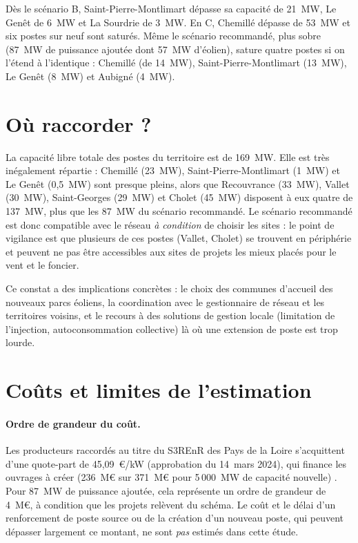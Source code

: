 \documentclass[11pt, a4paper]{report}
\begin{document}

Dès le scénario B, Saint-Pierre-Montlimart dépasse sa capacité de 21~MW, Le Genêt de 6~MW et La Sourdrie de 3~MW. En C, Chemillé dépasse de 53~MW et six postes sur neuf sont saturés. Même le scénario recommandé, plus sobre (87~MW de puissance ajoutée dont 57~MW d'éolien), sature quatre postes si on l'étend à l'identique : Chemillé (de 14~MW), Saint-Pierre-Montlimart (13~MW), Le Genêt (8~MW) et Aubigné (4~MW).

\section{Où raccorder ?}

La capacité libre totale des postes du territoire est de 169~MW. Elle est très inégalement répartie : Chemillé (23~MW), Saint-Pierre-Montlimart (1~MW) et Le Genêt (0,5~MW) sont presque pleins, alors que Recouvrance (33~MW), Vallet (30~MW), Saint-Georges (29~MW) et Cholet (45~MW) disposent à eux quatre de 137~MW, plus que les 87~MW du scénario recommandé. Le scénario recommandé est donc compatible avec le réseau \emph{à condition} de choisir les sites : le point de vigilance est que plusieurs de ces postes (Vallet, Cholet) se trouvent en périphérie et peuvent ne pas être accessibles aux sites de projets les mieux placés pour le vent et le foncier.

Ce constat a des implications concrètes : le choix des communes d'accueil des nouveaux parcs éoliens, la coordination avec le gestionnaire de réseau et les territoires voisins, et le recours à des solutions de gestion locale (limitation de l'injection, autoconsommation collective) là où une extension de poste est trop lourde.

\section{Coûts et limites de l'estimation}

\paragraph{Ordre de grandeur du coût.} Les producteurs raccordés au titre du S3REnR des Pays de la Loire s'acquittent d'une quote-part de 45,09~\euro/kW (approbation du 14~mars 2024), qui finance les ouvrages à créer (236~M\euro{} sur 371~M\euro{} pour 5\,000~MW de capacité nouvelle) \cite{dreal_s3renr}. Pour 87~MW de puissance ajoutée, cela représente un ordre de grandeur de 4~M\euro, à condition que les projets relèvent du schéma. Le coût et le délai d'un renforcement de poste source ou de la création d'un nouveau poste, qui peuvent dépasser largement ce montant, ne sont \emph{pas} estimés dans cette étude.
\end{document}
